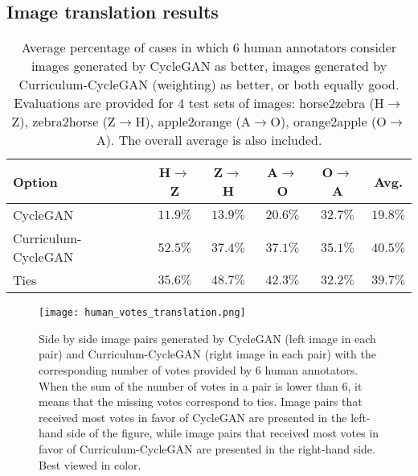 \documentclass[10pt,twocolumn,letterpaper]{article}
\begin{document}
\vspace{-0.1cm}
\subsection{Image translation results}
\vspace{-0.1cm}

\begin{table}[t]
\setlength\tabcolsep{2.0pt}
\small{
\begin{center}
\begin{tabular}{|l|c|c|c|c|c|}
\hline
Option & H$\rightarrow$Z & Z$\rightarrow$H & A$\rightarrow$O & O$\rightarrow$A  & Avg. \\
\hline
\hline
CycleGAN~\cite{Zhu-ICCV-2017}  & $11.9\%$ & $13.9\%$ & $20.6\%$ & $32.7\%$ & $19.8\%$\\
\hline
Curriculum-CycleGAN     & $52.5\%$ & $37.4\%$ & $37.1\%$ & $35.1\%$ & $40.5\%$\\
\hline
Ties                    & $35.6\%$ & $48.7\%$ & $42.3\%$ & $32.2\%$ & $39.7\%$\\
\hline
\end{tabular}
\end{center}
\vspace*{-0.15cm}
\caption{Average percentage of cases in which 6 human annotators consider images generated by CycleGAN as better, images generated by Curriculum-CycleGAN (weighting) as better, or both equally good. Evaluations are provided for 4 test sets of images: horse2zebra (H$\rightarrow$Z), zebra2horse (Z$\rightarrow$H), apple2orange (A$\rightarrow$O), orange2apple (O$\rightarrow$A). The overall average is also included.\label{tab_results}}
}
\vspace*{-0.4cm}
\end{table}

\begin{figure*}[!t]
\begin{center}
\texttt{[image: human\_votes\_translation.png]}
\end{center}
\vspace*{-0.45cm}
\caption{Side by side image pairs generated by CycleGAN (left image in each pair) and Curriculum-CycleGAN (right image in each pair) with the corresponding number of votes provided by 6 human annotators. When the sum of the number of votes in a pair is lower than 6, it means that the missing votes correspond to ties. Image pairs that received most votes in favor of CycleGAN are presented in the left-hand side of the figure, while image pairs that received most votes in favor of Curriculum-CycleGAN are presented in the right-hand side. Best viewed in color.}
\label{fig_translation_voted}
\vspace*{-0.3cm}
\end{figure*}
\end{document}
